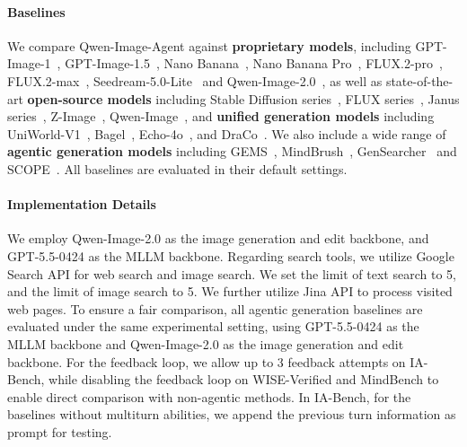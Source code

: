 \documentclass{llmxive}
\begin{document}
\paragraph{Baselines} We compare Qwen-Image-Agent against \textbf{proprietary models}, including GPT-Image-1~\citep{openai2024gptimage1}, GPT-Image-1.5~\citep{openai2025gptimage15}, Nano Banana~\citep{deepmind2024geminiimage25}, Nano Banana Pro~\citep{deepmind2024geminiimage}, FLUX.2-pro~\citep{blackforestlabs2026flux2pro}, FLUX.2-max~\citep{blackforestlabs2026flux2max}, Seedream-5.0-Lite~\citep{bytedance_seedream5_lite_2025} and Qwen-Image-2.0~\citep{Zhao2026QwenImage20TR}, as well as state-of-the-art \textbf{open-source models} including Stable Diffusion series~\citep{podell2023sdxl, rombach2022high, sd3Medium, sd35Medium, sd35Large}, FLUX series~\citep{flux2024, labs2025flux1kontextflowmatching, blackforestlabs2026flux2pro}, Janus series~\citep{wu2024janus, chen2025janus}, Z-Image~\citep{cai2025z}, Qwen-Image~\citep{wu2025qwen}, and \textbf{unified generation models} including UniWorld-V1~\citep{lin2025uniworld}, Bagel~\citep{deng2025bagel}, Echo-4o~\citep{ye2025echo}, and DraCo~\citep{jiang2025draco}. We also include a wide range of \textbf{agentic generation models} including GEMS~\citep{He2026GEMSAM}, MindBrush~\citep{He2026MindBrushIA}, GenSearcher~\citep{Feng2026GenSearcherRA} and SCOPE~\citep{Ren2026SCOPESD}. All baselines are evaluated in their default settings. 



\paragraph{Implementation Details}
We employ Qwen-Image-2.0 as the image generation and edit backbone, and GPT-5.5-0424 as the MLLM backbone. Regarding search tools, we utilize Google Search API for web search and image search. We set the limit of text search to 5, and the limit of image search to 5. We further utilize Jina API to process visited web pages. To ensure a fair comparison, all agentic generation baselines are evaluated under the same experimental setting, using GPT-5.5-0424 as the MLLM backbone and Qwen-Image-2.0 as the image generation and edit backbone. For the feedback loop, we allow up to 3 feedback attempts on IA-Bench, while disabling the feedback loop on WISE-Verified and MindBench to enable direct comparison with non-agentic methods. In IA-Bench, for the baselines without multiturn abilities, we append the previous turn information as prompt for testing.
\end{document}
